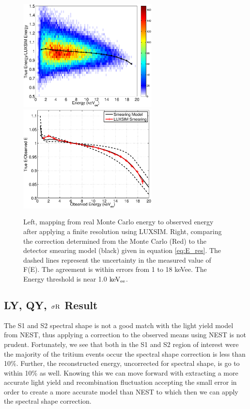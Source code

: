  \begin{figure}[h!]\centering
\includegraphics[width=70mm]{Chapter_Flucs/Figures/E_density_LUX_SIM_Tritium.eps}
\includegraphics[width=70mm]{Chapter_Flucs/Figures/E_corr.eps}
\caption{Left, mapping from real Monte Carlo energy to observed energy after applying a finite resolution using LUXSIM. Right, comparing the correction determined from the Monte Carlo (Red) to the detector smearing model (black) given in equation \ref{eq:E_res}. The dashed lines represent the uncertainty in the measured value of F(E). The agreement is within errors from 1 to 18 keVee. The Energy threshold is near 1.0 $\rm keV_{ee}$.}
\label{fig:E_mapping}
\end{figure}



\subsection{LY, QY, $\rm \sigma R$ Result}

 The S1 and S2 spectral shape is not a good match with the light yield model from NEST, thus applying a correction to the observed means using NEST is not prudent. Fortunately, we see that both in the S1 and S2 region of interest were the majority of the tritium events occur the spectral shape correction is less than 10\%. Further, the reconstructed energy, uncorrected for spectral shape, is go to within 10\% as well. Knowing this we can move forward with extracting a more accurate light yield and recombination fluctuation accepting the small error in order to create a more accurate model than NEST to which then we can apply the spectral shape correction.

